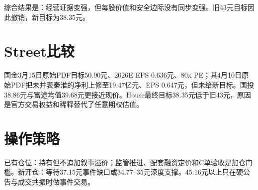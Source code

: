 综合结果是：经营证据变强，但每股价值和安全边际没有同步变强。旧43元目标因此撤销，新目标为38.35元。

\section{Street比较}

国金3月15日原始PDF目标50.90元、2026E EPS 0.636元、80x PE；其4月10日原始PDF把未并表秦淮的净利上修至19.47亿元、EPS 0.647元，但未给新目标。国投38.86元与富途均值39.68元更接近现价。House最终目标38.35元低于旧43元，原因是官方交易权益和稀释替代了任意期权估值。

\section{操作策略}

已有仓位：持有但不追加叙事溢价；监管推进、配套融资定价和C单验收是加仓门槛。新开仓：等待37.15元事件缺口或34.77--35元深度支撑。45.16元以上只在硬公告与成交共振时做事件交易。

